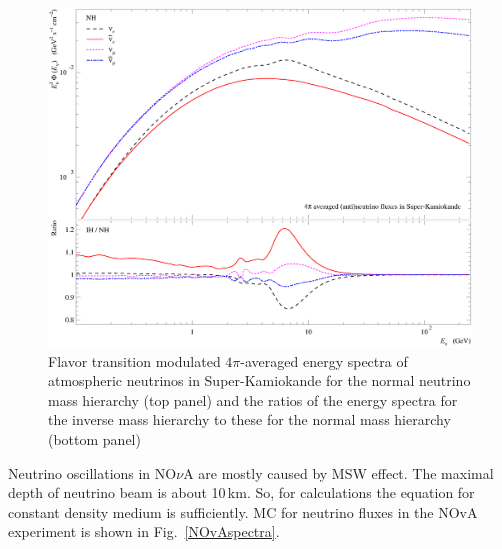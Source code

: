 \begin{figure}[htb!]
\includegraphics[width=\columnwidth]{./MSW/dF_dE_Honda11.eps}
\caption{\label{modspectra}Flavor transition modulated $4\pi$-averaged energy spectra of atmospheric neutrinos in Super-Kamiokande for the normal neutrino mass hierarchy (top panel) and the ratios of the energy spectra for the inverse mass hierarchy to these for the normal mass hierarchy (bottom panel)}
\end{figure}

Neutrino oscillations in NO$\nu$A are mostly caused by MSW effect. The maximal depth of neutrino beam is about 10\,km. So, for calculations the equation for constant density medium is sufficiently. MC for neutrino fluxes in the NOvA experiment is shown in Fig.~\ref{NOvAspectra}.


